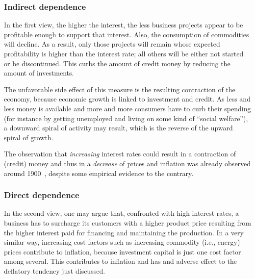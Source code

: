 \documentclass[aps,rmp,preprint,amsfonts,showpacs,showkeys]{revtex4}
\begin{document}
\subsubsection*{Indirect dependence}
In the first view, the higher the interest, the less business projects appear to be profitable enough to support that interest.
Also, the consumption of commodities will decline.
As a result, only those projects will remain whose expected profitability is higher than the interest rate;
all others will be either not started or be discontinued.
This curbs the amount of credit money by reducing the amount of investments.

The unfavorable side effect of this measure is the resulting contraction of the economy,
because economic growth is linked to investment and credit.
As less and less money is available and more and more consumers have to curb their spending
(for instance by getting unemployed and living on some kind of ``social welfare''),
a downward spiral of activity may result, which is the reverse of the upward spiral  \cite{2006-Binswanger} of growth.

The observation that {\em increasing} interest rates could result in a contraction of (credit) money and thus
in a {\em decrease} of prices and inflation was already observed around 1900~\cite{Wicksell-1907},
despite some empirical evidence to the contrary.

\subsubsection*{Direct dependence}
In the second view, one may argue that, confronted with high interest rates,
a business has to surcharge its customers with a higher product price resulting
from the higher interest paid for financing and maintaining the production.
In a very similar way, increasing cost factors such as increasing commodity (i.e., energy) prices contribute to inflation,
because investment capital is just one cost factor among several.
This contributes to inflation and has and adverse effect to the deflatory tendency just discussed.
\end{document}
